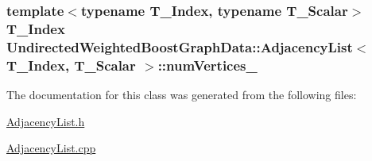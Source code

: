 \hypertarget{class_undirected_weighted_graph_1_1_adjacency_list_a32595c1491afb41034135ceb07eadb4d}{
\subsubsection[{num\+Vertices\+\_\+}]{\setlength{\rightskip}{0pt plus 5cm}template$<$typename T\+\_\+\+Index, typename T\+\_\+\+Scalar$>$ T\+\_\+\+Index {\bf Undirected\+Weighted\+BoostGraphData\+::\+Adjacency\+List}$<$ T\+\_\+\+Index, T\+\_\+\+Scalar $>$\+::num\+Vertices\+\_\+\hspace{0.3cm}{\ttfamily [private]}}}\label{class_undirected_weighted_graph_1_1_adjacency_list_a32595c1491afb41034135ceb07eadb4d}


The documentation for this class was generated from the following files\+:\begin{DoxyCompactItemize}
\item 
\hyperlink{_adjacency_list_8h}{Adjacency\+List.\+h}\item 
\hyperlink{_adjacency_list_8cpp}{Adjacency\+List.\+cpp}\end{DoxyCompactItemize}
